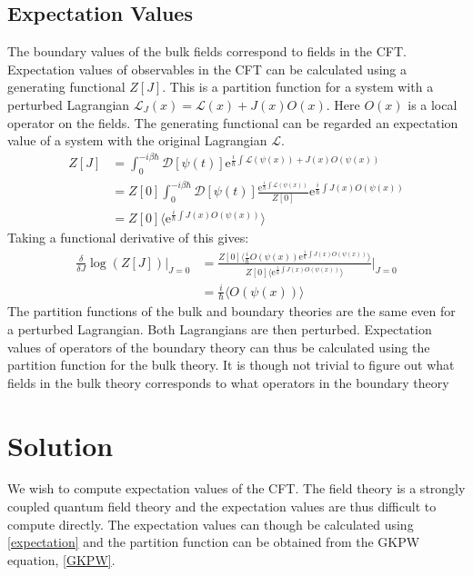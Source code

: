 \documentclass[12pt]{report}
\newcommand{\e}{\ensuremath{\mathrm{e}}}
\renewcommand{\L}{\ensuremath{\mathcal{L}}}
\renewcommand{\i}{\ensuremath{i}}
\begin{document}
\subsection{Expectation Values}
The boundary values of the bulk fields correspond to fields in the CFT. Expectation values of observables in the CFT can be calculated using a generating functional $Z[J]$. This is a partition function for a system with a perturbed Lagrangian $\L_J(x)=\L(x)+J(x)O(x)$. Here $O(x)$ is a local operator on the fields. The generating functional can be regarded an expectation value of a system with the original Lagrangian $\L$.
\begin{equation}
\begin{split}
 Z[J]&=\int_0^{-\i\beta\hbar} \mathcal{D}[\psi(t)]\e^{\frac{\i}{\hbar}\int \L(\psi(x))+J(x)O(\psi(x))}\\
&=Z[0]\int_0^{-\i\beta\hbar} \mathcal{D}[\psi(t)]\frac{\e^{\frac{\i}{\hbar}\int \L(\psi(x))}}{Z[0]}\e^{\frac{\i}{\hbar}\int J(x)O(\psi(x))}\\
&=Z[0]\langle\e^{\frac{\i}{\hbar}\int J(x)O(\psi(x))}\rangle
\end{split}
\end{equation}
Taking a functional derivative of this gives:
\begin{equation}
\begin{split}
 \frac{\delta}{\delta J}\log(Z[J])|_{J=0}&=\frac{Z[0]\langle\frac{\i}{\hbar}O(\psi(x))\e^{\frac{\i}{\hbar}\int J(x)O(\psi(x))}\rangle}{  Z[0]\langle\e^{\frac{\i}{\hbar}\int J(x)O(\psi(x))}\rangle }\big |_{J=0}\\
&=\frac{\i}{\hbar}\langle O(\psi(x))\rangle\label{expectation}
\end{split}
\end{equation}
The partition functions of the bulk and boundary theories are the same even for a perturbed Lagrangian. Both Lagrangians are then perturbed. Expectation values of operators of the boundary theory can thus be calculated using the partition function for the bulk theory. It is though not trivial to figure out what fields in the bulk theory corresponds to what operators in the boundary theory
\section{Solution}
We wish to compute expectation values of the CFT. The field theory is a strongly coupled quantum field theory and the expectation values are thus difficult to compute directly. The expectation values can though be calculated using \eqref{expectation} and the partition function can be obtained from the GKPW equation, \eqref{GKPW}.\\
\end{document}
